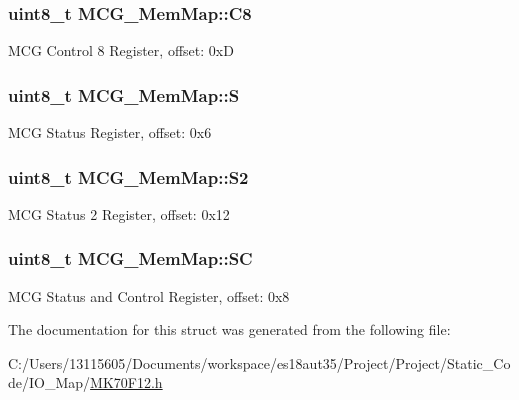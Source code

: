 \subsubsection[{C8}]{\setlength{\rightskip}{0pt plus 5cm}uint8\+\_\+t M\+C\+G\+\_\+\+Mem\+Map\+::\+C8}\label{struct_m_c_g___mem_map_a346a8b8c5c2c675e6297aaa1f14798df}
M\+C\+G Control 8 Register, offset\+: 0x\+D \hypertarget{struct_m_c_g___mem_map_a65ee0333e0d5c462c7dd8c2402bf93be}{}
\subsubsection[{S}]{\setlength{\rightskip}{0pt plus 5cm}uint8\+\_\+t M\+C\+G\+\_\+\+Mem\+Map\+::\+S}\label{struct_m_c_g___mem_map_a65ee0333e0d5c462c7dd8c2402bf93be}
M\+C\+G Status Register, offset\+: 0x6 \hypertarget{struct_m_c_g___mem_map_a97d548f46a8b3fa3cd094dbbd5e579af}{}
\subsubsection[{S2}]{\setlength{\rightskip}{0pt plus 5cm}uint8\+\_\+t M\+C\+G\+\_\+\+Mem\+Map\+::\+S2}\label{struct_m_c_g___mem_map_a97d548f46a8b3fa3cd094dbbd5e579af}
M\+C\+G Status 2 Register, offset\+: 0x12 \hypertarget{struct_m_c_g___mem_map_aeff584aa52340d7c66dc06789ad05310}{}
\subsubsection[{S\+C}]{\setlength{\rightskip}{0pt plus 5cm}uint8\+\_\+t M\+C\+G\+\_\+\+Mem\+Map\+::\+S\+C}\label{struct_m_c_g___mem_map_aeff584aa52340d7c66dc06789ad05310}
M\+C\+G Status and Control Register, offset\+: 0x8 

The documentation for this struct was generated from the following file\+:\begin{DoxyCompactItemize}
\item 
C\+:/\+Users/13115605/\+Documents/workspace/es18aut35/\+Project/\+Project/\+Static\+\_\+\+Code/\+I\+O\+\_\+\+Map/\hyperlink{_m_k70_f12_8h}{M\+K70\+F12.\+h}\end{DoxyCompactItemize}
